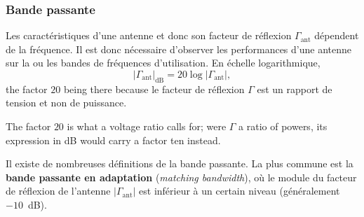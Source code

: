 \begin{figure}[h!]
  \centering
\end{figure}

\subsubsection{Bande passante}

Les caractéristiques d'une antenne et donc son facteur de réflexion
$\Gamma_{\mathrm{ant}}$ dépendent de la fréquence. Il est donc nécessaire
d'observer les performances d'une antenne sur la ou les bandes de fréquences
d'utilisation. En échelle logarithmique,
\[ |\Gamma_{\mathrm{ant}}|_{\mathrm{dB}} = 20 \log |\Gamma_{\mathrm{ant}}|, \]
the factor $20$ being there because le facteur de réflexion $\Gamma$ est un
rapport de tension et non de puissance.

\begin{remark}
  The factor $20$ is what a voltage ratio calls for; were $\Gamma$ a ratio of
  powers, its expression in dB would carry a factor ten instead.
\end{remark}

\begin{definition}
  Il existe de nombreuses définitions de la bande passante. La plus commune est
  la \textbf{bande passante en adaptation} (\textit{matching bandwidth}), où le
  module du facteur de réflexion de l'antenne $|\Gamma_{\mathrm{ant}}|$ est
  inférieur à un certain niveau (généralement $-10$~dB).
\end{definition}

